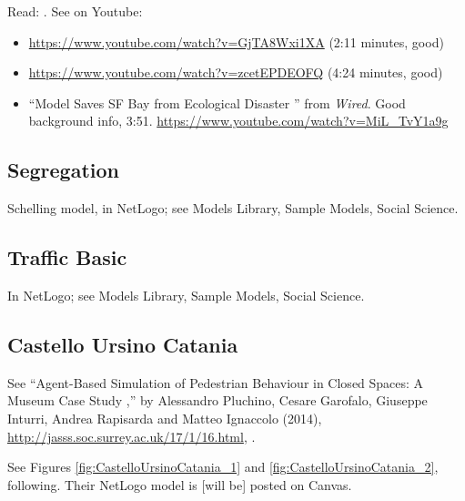  Read: \citet[chapters 1 and 2]{weisberg_2013}.
See on Youtube:
\begin{itemize}
\item \url{https://www.youtube.com/watch?v=GjTA8Wxi1XA} (2:11 minutes,
  good)
\item \url{https://www.youtube.com/watch?v=zcetEPDEOFQ} (4:24 minutes,
  good)
\item ``Model Saves SF Bay from Ecological Disaster '' from {\it
    Wired}. Good background info, 3:51. \url{https://www.youtube.com/watch?v=MiL_TvY1a9g}
\end{itemize}

\subsection{Segregation}

Schelling model, in NetLogo; see Models Library, Sample Models, Social Science.

\subsection{Traffic Basic}

In NetLogo; see Models Library, Sample Models, Social Science.

\subsection{Castello Ursino Catania}



See ``Agent-Based Simulation of Pedestrian Behaviour in Closed Spaces:
A Museum Case Study ,'' by Alessandro Pluchino, Cesare Garofalo,
Giuseppe Inturri, Andrea Rapisarda and Matteo Ignaccolo (2014),
\url{http://jasss.soc.surrey.ac.uk/17/1/16.html},
\citep{pluchino2014}.

See Figures \ref{fig:CastelloUrsinoCatania_1} and
\ref{fig:CastelloUrsinoCatania_2}, following. Their NetLogo model is
[will be]
posted on Canvas.

\newpage

